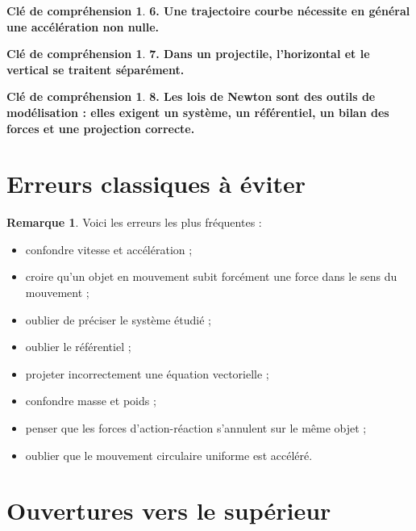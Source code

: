 \documentclass[11pt,a4paper]{article}
\theoremstyle{definition}
\newtheorem{remarque}[definition]{Remarque}
\newtheorem{interpretation}[definition]{Clé de compréhension}
\theoremstyle{plain}
\theoremstyle{remark}
\begin{document}
\begin{interpretation}
\textbf{6. Une trajectoire courbe nécessite en général une accélération non nulle.}
\end{interpretation}

\begin{interpretation}
\textbf{7. Dans un projectile, l'horizontal et le vertical se traitent séparément.}
\end{interpretation}

\begin{interpretation}
\textbf{8. Les lois de Newton sont des outils de modélisation : elles exigent un système, un référentiel, un bilan des forces et une projection correcte.}
\end{interpretation}

\section{Erreurs classiques à éviter}

\begin{remarque}
Voici les erreurs les plus fréquentes :
\begin{itemize}
    \item confondre vitesse et accélération ;
    \item croire qu'un objet en mouvement subit forcément une force dans le sens du mouvement ;
    \item oublier de préciser le système étudié ;
    \item oublier le référentiel ;
    \item projeter incorrectement une équation vectorielle ;
    \item confondre masse et poids ;
    \item penser que les forces d'action-réaction s'annulent sur le même objet ;
    \item oublier que le mouvement circulaire uniforme est accéléré.
\end{itemize}
\end{remarque}

\section{Ouvertures vers le supérieur}
\end{document}
